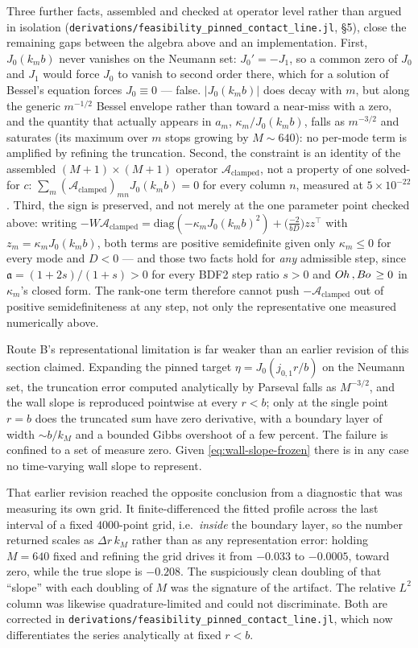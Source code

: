 Three further facts, assembled and checked at operator level rather than argued in isolation (\texttt{derivations/feasibility\_pinned\_contact\_line.jl}, \S5), close the remaining gaps between the algebra above and an implementation. First, $J_0(k_mb)$ never vanishes on the Neumann set: $J_0'=-J_1$, so a common zero of $J_0$ and $J_1$ would force $J_0$ to vanish to second order there, which for a solution of Bessel's equation forces $J_0\equiv0$ --- false. $|J_0(k_mb)|$ does decay with $m$, but along the generic $m^{-1/2}$ Bessel envelope rather than toward a near-miss with a zero, and the quantity that actually appears in $a_m$, $\kappa_m/J_0(k_mb)$, falls as $m^{-3/2}$ and saturates (its maximum over $m$ stops growing by $M\sim640$): no per-mode term is amplified by refining the truncation. Second, the constraint is an identity of the assembled $(M{+}1)\times(M{+}1)$ operator $\mathcal A_{\text{clamped}}$, not a property of one solved-for $c$: $\sum_m(\mathcal A_{\text{clamped}})_{mn}J_0(k_mb)=0$ for every column $n$, measured at $5\times10^{-22}$. Third, the sign is preserved, and not merely at the one parameter point checked above: writing $-W\mathcal A_{\text{clamped}}=\mathrm{diag}(-\kappa_mJ_0(k_mb)^2)+\big(\tfrac{-2}{bD}\big)zz^\top$ with $z_m=\kappa_mJ_0(k_mb)$, both terms are positive semidefinite given only $\kappa_m\le0$ for every mode and $D<0$ --- and those two facts hold for \emph{any} admissible step, since $\mathfrak a=(1+2s)/(1+s)>0$ for every BDF2 step ratio $s>0$ and $O\kern-0.04em h\,,B\kern-0.04em o\,\ge0$ in $\kappa_m$'s closed form. The rank-one term therefore cannot push $-\mathcal A_{\text{clamped}}$ out of positive semidefiniteness at any step, not only the representative one measured numerically above.

Route B's representational limitation is far weaker than an earlier revision of this section claimed. Expanding the pinned target $\eta=J_0(j_{0,1}r/b)$ on the Neumann set, the truncation error computed analytically by Parseval falls as $M^{-3/2}$, and the wall slope is reproduced pointwise at every $r<b$; only at the single point $r=b$ does the truncated sum have zero derivative, with a boundary layer of width $\sim b/k_M$ and a bounded Gibbs overshoot of a few percent. The failure is confined to a set of measure zero. Given \eqref{eq:wall-slope-frozen} there is in any case no time-varying wall slope to represent.

That earlier revision reached the opposite conclusion from a diagnostic that was measuring its own grid. It finite-differenced the fitted profile across the last interval of a fixed $4000$-point grid, i.e.\ \emph{inside} the boundary layer, so the number returned scales as $\Delta r\,k_M$ rather than as any representation error: holding $M=640$ fixed and refining the grid drives it from $-0.033$ to $-0.0005$, toward zero, while the true slope is $-0.208$. The suspiciously clean doubling of that ``slope'' with each doubling of $M$ was the signature of the artifact. The relative $L^2$ column was likewise quadrature-limited and could not discriminate. Both are corrected in \texttt{derivations/feasibility\_pinned\_contact\_line.jl}, which now differentiates the series analytically at fixed $r<b$.

